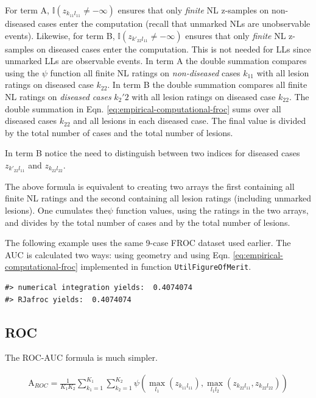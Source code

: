\documentclass[
]{book}
\begin{document}
For term A, \(\mathbb{I} \left ( z_{k_11l_11} \neq -\infty \right )\) ensures that only \emph{finite} NL z-samples on non-diseased cases enter the computation (recall that unmarked NLs are unobservable events). Likewise, for term B, \(\mathbb{I} \left ( z_{k'_22l_11} \neq -\infty \right )\) ensures that only \emph{finite} NL z-samples on diseased cases enter the computation. This is not needed for LLs since unmarked LLs are observable events. In term A the double summation compares using the \(\psi\) function all finite NL ratings on \emph{non-diseased} cases \(k_11\) with all lesion ratings on diseased case \(k_22\). In term B the double summation compares all finite NL ratings on \emph{diseased cases} \(k_2'2\) with all lesion ratings on diseased case \(k_22\). The double summation in Eqn. \eqref{eq:empirical-computational-froc} sums over all diseased cases \(k_22\) and all lesions in each diseased case. The final value is divided by the total number of cases and the total number of lesions.

In term B notice the need to distinguish between two indices for diseased cases \(z_{k'_22l_11}\) and \(z_{k_22l_22}\).

The above formula is equivalent to creating two arrays the first containing all finite NL ratings and the second containing all lesion ratings (including unmarked lesions). One cumulates the\(\psi\) function values, using the ratings in the two arrays, and divides by the total number of cases and by the total number of lesions.

The following example uses the same 9-case FROC dataset used earlier. The AUC is calculated two ways: using geometry and using Eqn. \eqref{eq:empirical-computational-froc} implemented in function \texttt{UtilFigureOfMerit}.

\begin{verbatim}
#> numerical integration yields:  0.4074074
#> RJafroc yields:  0.4074074
\end{verbatim}

\hypertarget{roc}{%
\subsection{ROC}\label{roc}}

The ROC-AUC formula is much simpler.

\begin{equation}
\begin{aligned}
\text{A}_{ROC} = \frac{1}{K_1K_2}\sum_{k_1=1}^{K_1}\sum_{k_2=1}^{K_2} \psi\left ( \max_{l_1}\left (z_{k_11l_11} \right ), \max_{l_1l_2}\left (z_{k_22l_11}, z_{k_22l_22}  \right ) \right )
\end{aligned}
\label{eq:empirical-computational-roc}
\end{equation}
\end{document}
